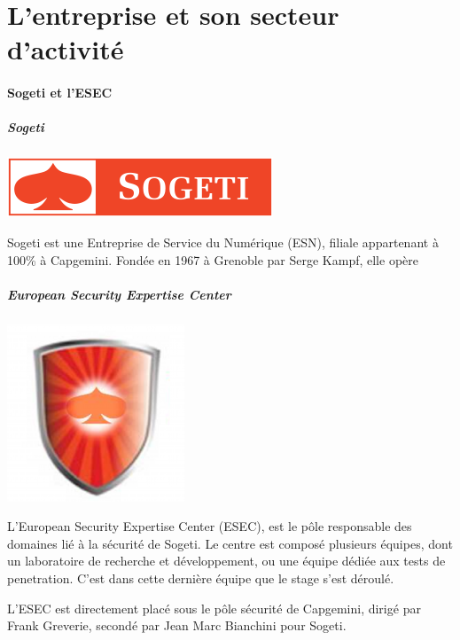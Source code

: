 \section*{L'entreprise et son secteur d'activité}
\paragraph{Sogeti et l'ESEC}
\subparagraph{Sogeti}
\begin{center}
\includegraphics[scale=0.7]{sogeti.png}
\end{center}
Sogeti est une Entreprise de Service du Numérique (ESN), filiale appartenant
à 100\% à Capgemini. Fondée en 1967 à Grenoble par Serge Kampf, elle opère
\paragraph{}
\paragraph{}

\subparagraph{European Security Expertise Center}
\begin{center}
\includegraphics[scale=0.4]{esec.png}
\end{center}
L'European Security Expertise Center (ESEC), est le pôle responsable des domaines
lié à la sécurité de Sogeti. Le centre est composé plusieurs équipes, dont un
laboratoire de recherche et développement, ou une équipe dédiée aux tests de penetration.
C'est dans cette dernière équipe que le stage s'est déroulé.

L'ESEC est directement placé sous le pôle sécurité de Capgemini, dirigé par Frank
Greverie, secondé par Jean Marc Bianchini pour Sogeti.

